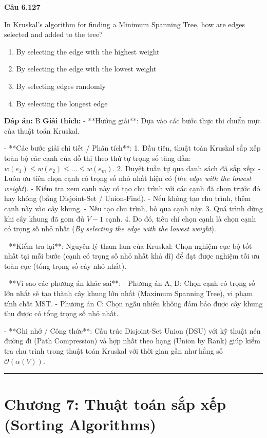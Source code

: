 \documentclass[11pt,a4paper]{article}
\newenvironment{question}[1]{%
  \par\vspace{1em}\noindent\textbf{\large Câu #1}\par\vspace{0.4em}
}{%
  \par\vspace{1em}\hrule\vspace{0.6em}
}
\newenvironment{choices}{%
  \begin{enumerate}[label=\textbf{\Alph*.},leftmargin=2.2em,itemsep=2pt,topsep=3pt]
}{%
  \end{enumerate}
}
\newcommand{\choice}{\item}
\begin{document}
\begin{question}{6.127}
In Kruskal's algorithm for finding a Minimum Spanning Tree, how are edges selected and added to the tree?
\begin{choices}
\choice By selecting the edge with the highest weight
\choice By selecting the edge with the lowest weight
\choice By selecting edges randomly
\choice By selecting the longest edge
\end{choices}
\textbf{Đáp án:} B
\textbf{Giải thích:} - **Hướng giải**:
Dựa vào các bước thực thi chuẩn mực của thuật toán Kruskal.


- **Các bước giải chi tiết / Phân tích**:
1. Đầu tiên, thuật toán Kruskal sắp xếp toàn bộ các cạnh của đồ thị theo thứ tự trọng số tăng dần: \(w(e_1) \le w(e_2) \le \dots \le w(e_m)\).
2. Duyệt tuần tự qua danh sách đã sắp xếp:
   - Luôn ưu tiên chọn cạnh có trọng số nhỏ nhất hiện có (\textit{the edge with the lowest weight}).
   - Kiểm tra xem cạnh này có tạo chu trình với các cạnh đã chọn trước đó hay không (bằng Disjoint-Set / Union-Find).
   - Nếu không tạo chu trình, thêm cạnh này vào cây khung.
   - Nếu tạo chu trình, bỏ qua cạnh này.
3. Quá trình dừng khi cây khung đã gom đủ \(V - 1\) cạnh.
4. Do đó, tiêu chí chọn cạnh là chọn cạnh có trọng số nhỏ nhất (\textit{By selecting the edge with the lowest weight}).


- **Kiểm tra lại**:
Nguyên lý tham lam của Kruskal: Chọn nghiệm cục bộ tốt nhất tại mỗi bước (cạnh có trọng số nhỏ nhất khả dĩ) để đạt được nghiệm tối ưu toàn cục (tổng trọng số cây nhỏ nhất).


- **Vì sao các phương án khác sai**:
- Phương án A, D: Chọn cạnh có trọng số lớn nhất sẽ tạo thành cây khung lớn nhất (Maximum Spanning Tree), vi phạm tính chất MST.
- Phương án C: Chọn ngẫu nhiên không đảm bảo được cây khung thu được có tổng trọng số nhỏ nhất.


- **Ghi nhớ / Công thức**:
Cấu trúc Disjoint-Set Union (DSU) với kỹ thuật nén đường đi (Path Compression) và hợp nhất theo hạng (Union by Rank) giúp kiểm tra chu trình trong thuật toán Kruskal với thời gian gần như hằng số \(\mathcal{O}(\alpha(V))\).
\end{question}

\newpage
\section*{Chương 7: Thuật toán sắp xếp (Sorting Algorithms)}
\end{document}
